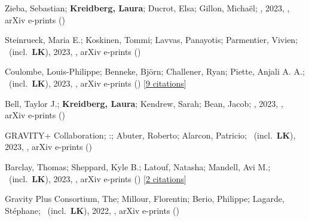 \item[{\color{numcolor}\scriptsize19}] Zieba, Sebastian; \textbf{Kreidberg, Laura}; Ducrot, Elsa; Gillon, Micha{\"e}l; \etal, 2023, , arXiv e-prints ()

\item[{\color{numcolor}\scriptsize18}] Steinrueck, Maria E.; Koskinen, Tommi; Lavvas, Panayotis; Parmentier, Vivien; \etal\ (incl.\ \textbf{LK}), 2023, , arXiv e-prints ()

\item[{\color{numcolor}\scriptsize17}] Coulombe, Louis-Philippe; Benneke, Bj{\"o}rn; Challener, Ryan; Piette, Anjali A. A.; \etal\ (incl.\ \textbf{LK}), 2023, , arXiv e-prints () [\href{https://ui.adsabs.harvard.edu/abs/2023arXiv230108192C}{9 citations}]

\item[{\color{numcolor}\scriptsize16}] Bell, Taylor J.; \textbf{Kreidberg, Laura}; Kendrew, Sarah; Bean, Jacob; \etal, 2023, , arXiv e-prints ()

\item[{\color{numcolor}\scriptsize15}] GRAVITY+ Collaboration; :; Abuter, Roberto; Alarcon, Patricio; \etal\ (incl.\ \textbf{LK}), 2023, , arXiv e-prints ()

\item[{\color{numcolor}\scriptsize14}] Barclay, Thomas; Sheppard, Kyle B.; Latouf, Natasha; Mandell, Avi M.; \etal\ (incl.\ \textbf{LK}), 2023, , arXiv e-prints () [\href{https://ui.adsabs.harvard.edu/abs/2023arXiv230110866B}{2 citations}]

\item[{\color{numcolor}\scriptsize13}] Gravity Plus Consortium, The; Millour, Florentin; Berio, Philippe; Lagarde, St{\'e}phane; \etal\ (incl.\ \textbf{LK}), 2022, , arXiv e-prints ()


